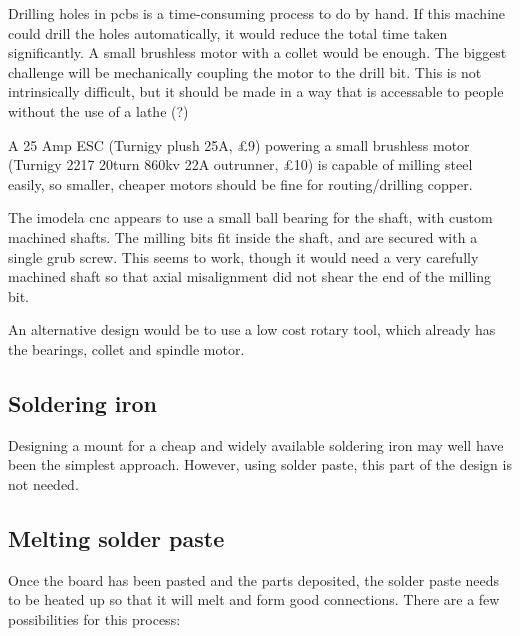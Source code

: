 \documentclass[a4paper,11pt]{article}  %
\begin{document}
Drilling holes in pcbs is a time-consuming process to do by hand. If this machine could drill the holes automatically,
it would reduce the total time taken significantly. A small brushless motor with a collet would be enough. The biggest challenge
will be mechanically coupling the motor to the drill bit. This is not intrinsically difficult, but it should be made in a way that
is accessable to people without the use of a lathe (?)

A 25 Amp ESC (Turnigy plush 25A, £9) powering a small brushless motor (Turnigy 2217 20turn 860kv 22A outrunner, £10) is capable of milling
steel easily, so smaller, cheaper motors should be fine for routing/drilling copper.

The imodela cnc appears to use a small ball bearing for the shaft, with custom machined shafts. The milling bits fit inside the shaft, and
are secured with a single grub screw. This seems to work, though it would need a very carefully machined shaft so that axial misalignment
did not shear the end of the milling bit.

An alternative design would be to use a low cost rotary tool, which already has the bearings, collet and spindle motor. 

\subsection{Soldering iron}
Designing a mount for a cheap and widely available soldering iron may well have been the simplest approach. However, using solder paste, 
this part of the design is not needed.

\subsection{Melting solder paste}
Once the board has been pasted and the parts deposited, the solder paste needs to be heated up so that it will melt and form good connections.
There are a few possibilities for this process:
\end{document}
